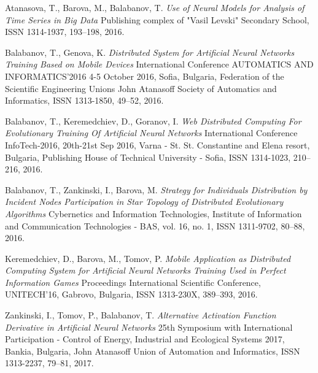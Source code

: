 \documentclass{llncs}
\begin{document}
\begin{thebibliography}{99}

 Atanasova, T., Barova, M., Balabanov, T. \textit{Use of Neural Models for Analysis of Time Series in Big Data} Publishing complex of "Vasil Levski" Secondary School, ISSN 1314-1937,  193--198, 2016.

 Balabanov, T., Genova, K. \textit{Distributed System for Artificial Neural Networks Training Based on Mobile Devices} International Conference AUTOMATICS AND INFORMATICS’2016 4-5 October 2016, Sofia, Bulgaria, Federation of the Scientific Engineering Unions John Atanasoff Society of Automatics and Informatics, ISSN 1313-1850, 49--52, 2016.

 Balabanov, T., Keremedchiev, D., Goranov, I. \textit{Web Distributed Computing For Evolutionary Training Of Artificial Neural Networks} International Conference InfoTech-2016, 20th-21st Sep 2016, Varna - St. St. Constantine and Elena resort, Bulgaria, Publishing House of Technical University - Sofia, ISSN 1314-1023, 210--216, 2016.

 Balabanov, T., Zankinski, I., Barova, M. \textit{Strategy for Individuals Distribution by Incident Nodes Participation in Star Topology of Distributed Evolutionary Algorithms} Cybernetics and Information Technologies, Institute of Information and Communication Technologies - BAS, vol. 16, no. 1, ISSN 1311-9702, 80--88, 2016.

 Keremedchiev, D., Barova, M., Tomov, P. \textit{Mobile Application as Distributed Computing System for Artificial Neural Networks Training Used in Perfect Information Games} Proceedings International Scientific Conference, UNITECH’16, Gabrovo, Bulgaria, ISSN 1313-230X, 389--393, 2016.

 Zankinski, I., Tomov, P., Balabanov, T. \textit{Alternative Activation Function Derivative in Artificial Neural Networks} 25th Symposium with International Participation - Control of Energy, Industrial and Ecological Systems 2017, Bankia, Bulgaria, John Atanasoff Union of Automation and Informatics, ISSN 1313-2237, 79--81, 2017.


\end{thebibliography}
\end{document}
